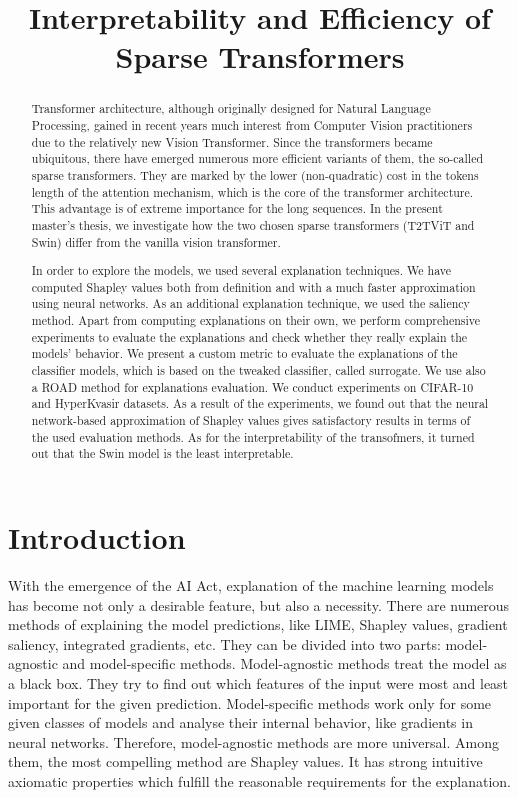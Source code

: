 \documentclass[magisterska,en]{pracamgr}
\title{Interpretability and Efficiency of Sparse Transformers}
\begin{document}
\maketitle

\begin{abstract}
Transformer architecture, although originally designed for Natural Language Processing, gained in recent years much interest from Computer Vision practitioners due to the relatively new Vision Transformer. Since the transformers became ubiquitous, there have emerged numerous more efficient variants of them, the so-called sparse transformers. They are marked by the lower (non-quadratic) cost in the tokens length of the attention mechanism, which is the core of the transformer architecture. This advantage is of extreme importance for the long sequences. In the present master's thesis, we investigate how the two chosen sparse transformers (T2T\textunderscore ViT and Swin) differ from the vanilla vision transformer. 

In order to explore the models, we used several explanation techniques. We have computed Shapley values both from definition and with a much faster approximation using neural networks. As an additional explanation technique, we used the saliency method. Apart from computing explanations on their own, we perform comprehensive experiments to evaluate the explanations and check whether they really explain the models' behavior. We present a custom metric to evaluate the explanations of the classifier models, which is based on the tweaked classifier, called surrogate. We use also a ROAD method for explanations evaluation. We conduct experiments on CIFAR-10 and HyperKvasir datasets.
As a result of the experiments, we found out that the neural network-based approximation of Shapley values gives satisfactory results in terms of the used evaluation methods. As for the interpretability of the transofmers, it turned out that the Swin model is the least interpretable.
\end{abstract}

\tableofcontents

\chapter*{Introduction}
With the emergence of the AI Act, explanation of the machine learning models has become not only a desirable feature, but also a necessity. There are numerous methods of explaining the model predictions, like LIME, Shapley values, gradient saliency, integrated gradients, etc. They can be divided into two parts: model-agnostic and model-specific methods. Model-agnostic methods treat the model as a black box. They try to find out which features of the input were most and least important for the given prediction. Model-specific methods work only for some given classes of models and analyse their internal behavior, like gradients in neural networks.
Therefore, model-agnostic methods are more universal. Among them, the most compelling method are Shapley values. It has strong intuitive axiomatic properties which fulfill the reasonable requirements for the explanation. 
\end{document}

